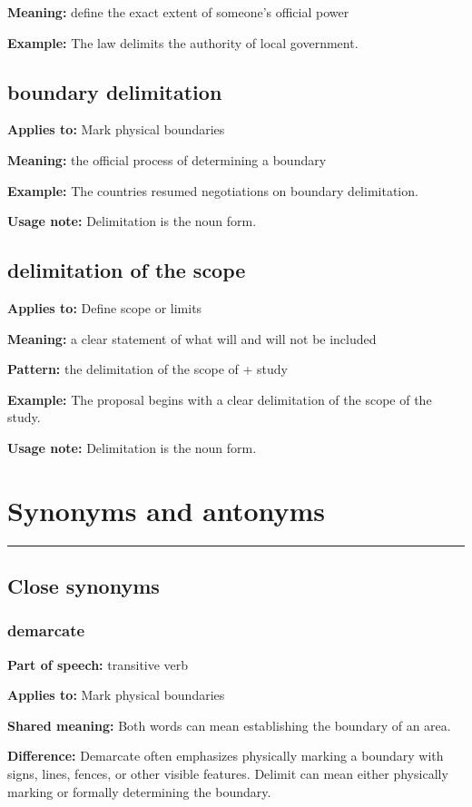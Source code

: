\documentclass[11pt]{article}
\newcommand{\sectionrule}{\par\vspace{-0.5em}\noindent\textcolor{Accent}{\rule{\linewidth}{0.6pt}}\par}
\begin{document}
\textbf{Meaning:} define the exact extent of someone's official power

\textbf{Example:} The law delimits the authority of local government.

\subsection{boundary delimitation}
\textbf{Applies to:} Mark physical boundaries

\textbf{Meaning:} the official process of determining a boundary

\textbf{Example:} The countries resumed negotiations on boundary delimitation.

\textbf{Usage note:} Delimitation is the noun form.

\subsection{delimitation of the scope}
\textbf{Applies to:} Define scope or limits

\textbf{Meaning:} a clear statement of what will and will not be included

\textbf{Pattern:} the delimitation of the scope of + study

\textbf{Example:} The proposal begins with a clear delimitation of the scope of the study.

\textbf{Usage note:} Delimitation is the noun form.

\section{Synonyms and antonyms}
\sectionrule
\subsection{Close synonyms}
\subsubsection{demarcate}
\textbf{Part of speech:} transitive verb

\textbf{Applies to:} Mark physical boundaries

\textbf{Shared meaning:} Both words can mean establishing the boundary of an area.

\textbf{Difference:} Demarcate often emphasizes physically marking a boundary with signs, lines, fences, or other visible features. Delimit can mean either physically marking or formally determining the boundary.
\end{document}
